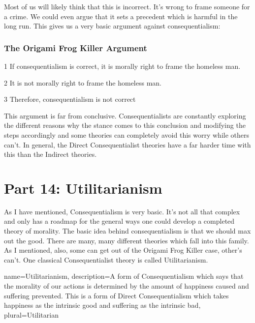 Most of us will likely think that this is incorrect. It's wrong to frame someone for a crime. We could even argue that it sets a precedent which is harmful in the long run. This gives us a very basic argument against consequentialism: 
\subsection{The Origami Frog Killer Argument}

\begin{earg}
    \item[1] If consequentialism is correct, it is morally right to frame the homeless man.
    \item[2] It is not morally right to frame the homeless man.
    \item[3] Therefore, consequentialism is not correct
\end{earg}

This argument is far from conclusive. Consequentialists are constantly exploring the different reasons why the stance comes to this conclusion and modifying the steps accordingly and some theories can completely avoid this worry while others can't. In general, the Direct Consequentialist theories have a far harder time with this than the Indirect theories. 

\chapter{Part 14: Utilitarianism}

As I have mentioned, Consequentialism is very basic. It’s not all that complex and only has a roadmap for the general ways one could develop a completed theory of morality. The basic idea behind consequentialism is that we should max out the good. There are many, many different theories which fall into this family. As I mentioned, also, some can get out of the Origami Frog Killer case, other’s can’t. One classical Consequentialist theory is called \gls{Utilitarianism}.

{
  name=Utilitarianism,
  description={A form of Consequentialism which says that the morality of our actions is determined by the amount of happiness caused and suffering prevented. This is a form of Direct Consequentialism which takes happiness as the intrinsic good and suffering as the intrinsic bad},
  plural=Utilitarian
}



